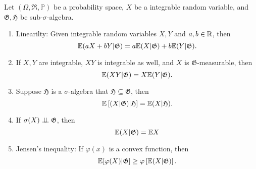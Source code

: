 \begin{theorem}
Let $(\Omega,\mathfrak{R},\mathbb{P})$ be a probability space, $X$ be a integrable random variable, and $\mathfrak{G,H}$ be sub-$\sigma$-algebra.
\begin{enumerate}
\item Linearilty: Given integrable random variables $X,Y$ and $a,b\in\mathbb{R}$, then
\begin{equation}
\mathbb{E}(aX+bY|\mathfrak{G})=a\mathbb{E}(X|\mathfrak{G})+b\mathbb{E}(Y|\mathfrak{G}).
\end{equation}
\item If $X,Y$ are integrable, $XY$ is integrable as well, and $X$ is $\mathfrak{G}$-measurable, then 
\begin{equation}
\mathbb{E}(XY|\mathfrak{G})=X\mathbb{E}(Y|\mathfrak{G}).
\end{equation}
\item Suppose $\mathfrak{H}$ is a $\sigma$-algebra that $\mathfrak{H}\subseteq\mathfrak{G}$, then
\begin{equation}
\mathbb{E}\left[(X|\mathfrak{G})|\mathfrak{H}\right]=\mathbb{E}(X|\mathfrak{H}).
\end{equation}
\item If $\sigma(X)\perp\!\!\!\perp\mathfrak{G}$, then
\begin{equation}
\mathbb{E}(X|\mathfrak{G})=\mathbb{E} X
\end{equation}
\item Jensen's inequality: If $\varphi(x)$ is a convex function, then
\begin{equation}
\mathbb{E}[\varphi(X)|\mathfrak{G}]\ge\varphi\left[\mathbb{E}(X|\mathfrak{G})\right].
\end{equation}
\end{enumerate}
\end{theorem}

